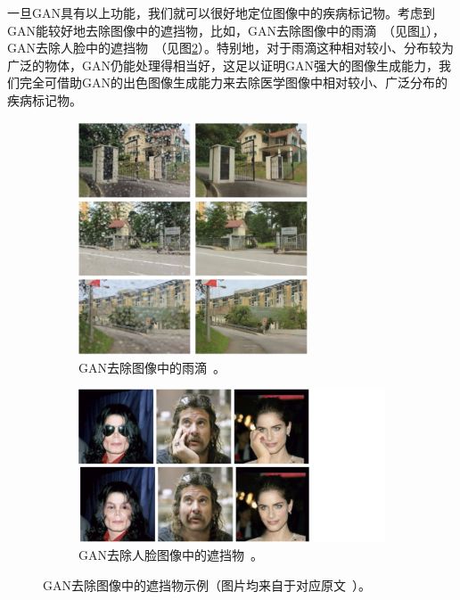 \noindent 一旦GAN具有以上功能，我们就可以很好地定位图像中的疾病标记物。考虑到GAN能较好地去除图像中的遮挡物，比如，GAN去除图像中的雨滴~\cite{qian2018attentive}（见图\ref{subfig:attention_gan}），GAN去除人脸中的遮挡物~\cite{yuan2019face}（见图\ref{subfig:face_de_occulusion}）。特别地，对于雨滴这种相对较小、分布较为广泛的物体，GAN仍能处理得相当好，这足以证明GAN强大的图像生成能力，我们完全可借助GAN的出色图像生成能力来去除医学图像中相对较小、广泛分布的疾病标记物。
\begin{figure}[h!]
	\begin{subfigure}{0.45\textwidth}
		\centering
		\includegraphics[width=0.75\textwidth]{figure/attention_gan_example.png}
		\caption{GAN去除图像中的雨滴~\cite{qian2018attentive}。}
		\label{subfig:attention_gan}
	\end{subfigure}
	\begin{subfigure}{0.45\textwidth}
		\centering
		\includegraphics[width=1.5\textwidth]{figure/face_de_occulusion.png}
		\caption{GAN去除人脸图像中的遮挡物~\cite{yuan2019face}。}
		\label{subfig:face_de_occulusion}
	\end{subfigure}
	\caption[GAN去除图像中的遮挡物示例]{GAN去除图像中的遮挡物示例（图片均来自于对应原文~\cite{qian2018attentive,yuan2019face}）。}
	\label{mul_fig:gan_auto_encoder_example}
\end{figure}
